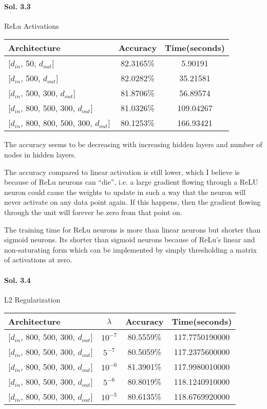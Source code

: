 \documentclass[]{report}
\begin{document}
\paragraph{Sol. 3.3}
	ReLu Activations
	\begin{center}
		\begin{tabular}{l|c|c}
			\hline
			 Architecture                        & Accuracy   &   Time(seconds) \\
			\hline
			 {[$d_{in}$, 50, $d_{out}$]}                 & 82.3165\%   &         5.90191 \\
			 {[$d_{in}$, 500, $d_{out}$]}                & 82.0282\%   &        35.21581 \\
			 {[$d_{in}$, 500, 300, $d_{out}$]}           & 81.8706\%   &        56.89574 \\
			 {[$d_{in}$, 800, 500, 300, $d_{out}$]}      & 81.0326\%   &       109.04267 \\
			 {[$d_{in}$, 800, 800, 500, 300, $d_{out}$]} & 80.1253\%   &       166.93421 \\
			\hline
		\end{tabular}
	\end{center}

	The accuracy seems to be decreasing with increasing hidden layers and number of nodes in hidden layers.

	The accuracy compared to linear activation is still lower, which I believe is because of ReLu neurons can ``die'', i.e. a large gradient flowing through a ReLU neuron could cause the weights to update in such a way that the neuron will never activate on any data point again. If this happens, then the gradient flowing through the unit will forever be zero from that point on.

	The training time for ReLu neurons is more than linear neurons but shorter than sigmoid neurons. Its shorter than sigmoid neurons because of ReLu's linear and non-saturating form which can be implemented by simply thresholding a matrix of activations at zero. 
	

\paragraph{Sol. 3.4}
	L2 Regularization
	\begin{center}
		\begin{tabular}{l|c|c|c}
			\hline
			 Architecture                   &       $\lambda$ & Accuracy   &   Time(seconds) \\
			\hline
			{[$d_{in}$, 800, 500, 300, $d_{out}$]} & $10^{-7}$   & 80.5559\%   &  117.7750190000 \\
			{[$d_{in}$, 800, 500, 300, $d_{out}$]} & $5^{-7} $  & 80.5059\%   &  117.2375600000 \\
			{[$d_{in}$, 800, 500, 300, $d_{out}$]} & $10^{-6}$  & 81.3901\%   &  117.9980010000 \\
			{[$d_{in}$, 800, 500, 300, $d_{out}$]} & $5^{-6} $  & 80.8019\%   &  118.1240910000 \\
			{[$d_{in}$, 800, 500, 300, $d_{out}$]} & $10^{-5}$  & 80.6135\%   &  118.6769920000 \\
			\hline
		\end{tabular}
	\end{center}
\end{document}
